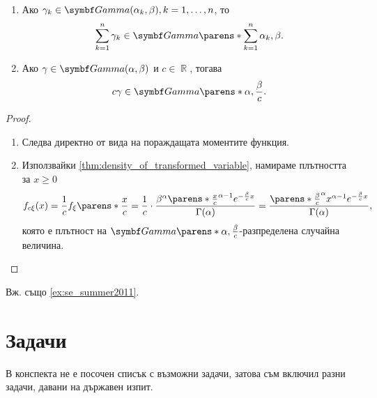 \documentclass{../../common/topic}
\begin{document}
\begin{proposition}\label{thm:gamma_linear_combination_is_gamma}
  \hfill
  \begin{enumerate}
    \item Ако \( \gamma_k \in \distr{Gamma}(\alpha_k, \beta), k = 1, \ldots, n \), то
    \begin{equation*}
      \sum_{k=1}^n \gamma_k \in \distr{Gamma}\parens*{ \sum_{k=1}^n \alpha_k, \beta }.
    \end{equation*}

    \item Ако \( \gamma \in \distr{Gamma}(\alpha, \beta) \) и \( c \in \BbbR \), тогава
    \begin{equation*}
      c \gamma \in \distr{Gamma}\parens*{\alpha, \frac \beta c }.
    \end{equation*}
  \end{enumerate}
\end{proposition}
\begin{proof}
  \hfill
  \begin{enumerate}
    \item Следва директно от вида на пораждащата моментите функция.
    \item Използвайки \cref{thm:density_of_transformed_variable}, намираме плътността за \( x \geq 0 \)
    \begin{equation*}
      f_{c\xi}(x)
      =
      \frac 1 c f_\xi\parens*{\frac x c }
      =
      \frac 1 c \cdot \frac {\beta^\alpha {\parens*{\frac x c }}^{\alpha-1} e^{-\frac \beta c x}} {\Gamma(\alpha)}
      =
      \frac {{\parens*{\frac \beta c }}^\alpha x^{\alpha-1} e^{-\frac \beta c x}} {\Gamma(\alpha)},
    \end{equation*}
    която е плътност на \( \distr{Gamma}\parens*{\alpha, \frac \beta c } \)-разпределена случайна величина.
  \end{enumerate}
\end{proof}

Вж. също \cref{ex:se_summer2011}.

\section{Задачи}

В конспекта не е посочен списък с възможни задачи, затова съм включил разни задачи, давани на държавен изпит.
\end{document}
